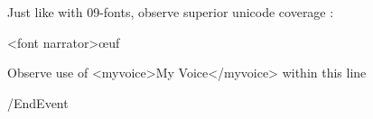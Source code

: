 

%


Just like with 09-fonts, observe superior unicode coverage :

<font narrator>œuf

Observe use of <myvoice>My Voice</myvoice> within this line

\option /EndEvent
 
